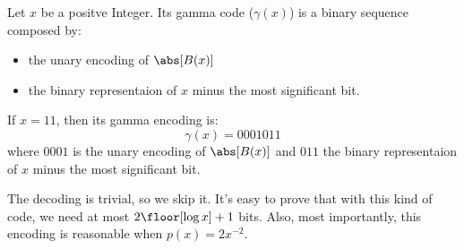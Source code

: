 \documentclass{subfiles}
\begin{document}
    Let \(x\) be a positve Integer.
        Its gamma code (\(\gamma(x)\)) is a binary sequence composed by:
        \begin{itemize}
            \item the unary encoding of \(\abs[B(x)]\)
            \item the binary representaion of \(x\) minus the most significant bit.
        \end{itemize}

    \begin{example*}
        If \(x = 11\), then its gamma encoding is:
            \[
                \gamma(x) = 0001011
            \]
        where \(0001\) is the unary encoding of \(\abs[B(x)]\) and \(011\)
        the binary representaion of \(x\) minus the most significant bit.
    \end{example*}

    The decoding is trivial, so we skip it.
    It's easy to prove that with this kind of code, we need at most \(2 \floor[\log x] + 1\)
    bits. Also, most importantly, this encoding is reasonable when \(p(x) = 2x^{-2}\).
\end{document}
